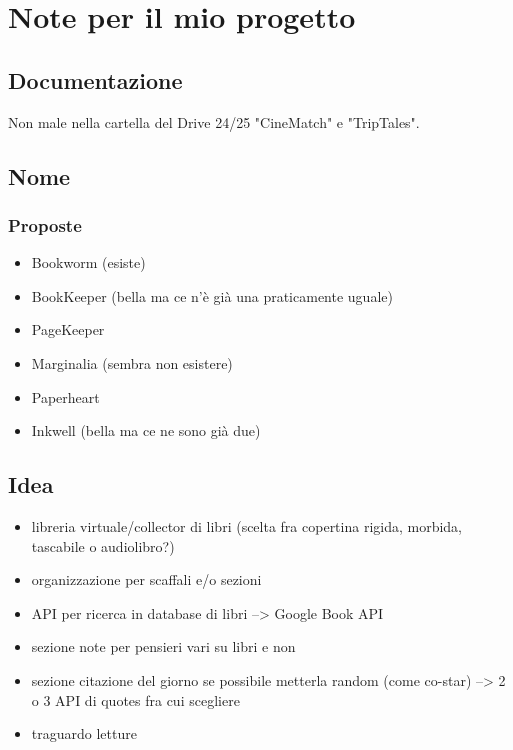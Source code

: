 
\chapter{Note per il mio progetto}
\section{Documentazione}
\par Non male nella cartella del Drive 24/25 "CineMatch" e "TripTales".

\section{Nome}
\subsection{Proposte}
\begin{itemize}
    \item Bookworm (esiste)
    \item BookKeeper (bella ma ce n'è già una praticamente uguale)
    \item PageKeeper
    \item Marginalia (sembra non esistere)
    \item Paperheart
    \item Inkwell (bella ma ce ne sono già due)
\end{itemize}

\section{Idea}
\begin{itemize}
    \item libreria virtuale/collector di libri (scelta fra copertina rigida, morbida, tascabile o audiolibro?)
    \item organizzazione per scaffali e/o sezioni
    \item API per ricerca in database di libri --> Google Book API
    \item sezione note per pensieri vari su libri e non
    \item sezione citazione del giorno se possibile metterla random (come co-star) --> 2 o 3 API di quotes fra cui scegliere
    \item traguardo letture
\end{itemize}